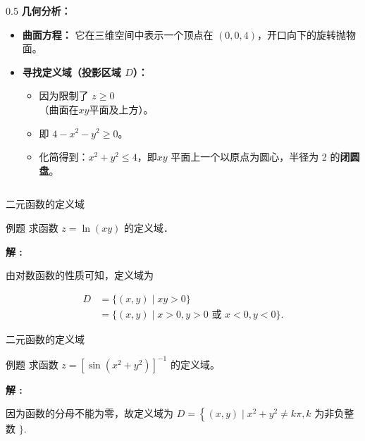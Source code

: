 \documentclass[aspectratio=169,10pt]{ctexbeamer}
\begin{document}
\begin{frame}{}
\begin{columns}[c]
\begin{column}{0.5\textwidth}
			\vspace{0.3cm}
			\textbf{几何分析：}
			\begin{itemize}
				\item \textbf{曲面方程：} 它在三维空间中表示一个顶点在 $(0,0,4)$，开口向下的旋转抛物面。
				\item \textbf{寻找定义域（投影区域 $D$）：}
				\begin{itemize}
					\item 因为限制了 $z \ge 0$\\（曲面在$xy$平面及上方）。
					\item 即 $4 - x^2 - y^2 \ge 0$。
					\item 化简得到：$x^2 + y^2 \le 4$，即$xy$ 平面上一个以原点为圆心，半径为 2 的\textbf{闭圆盘}。
				\end{itemize}
			\end{itemize}
		\end{column}
		
	\end{columns}
\end{frame}








\begin{frame}{二元函数的定义域}
	\begin{block}{例题}
		求函数 $z=\ln (x y)$ 的定义域．
	\end{block}
	
	\pause
	
	\vspace{0.5cm}
	
	\textbf{解 :}
	
	由对数函数的性质可知，定义域为
	
	$$
	\begin{aligned}
		D & =\{(x, y) \mid x y>0\} \\
		& =\{(x, y) \mid x>0, y>0 \text { 或 } x<0, y<0\} .
	\end{aligned}
	$$
	
	
	
\end{frame}


\begin{frame}{二元函数的定义域}
	\begin{block}{例题}
		求函数 $z=\left[\sin \left(x^2+y^2\right)\right]^{-1}$ 的定义域。
	\end{block}
	
	\pause
	
	\vspace{0.8cm}
	
	\textbf{解 :}
	
	因为函数的分母不能为零，故定义域为
	$D=\left\{(x, y) \mid x^2+y^2 \neq k \pi, k\right.$ 为非负整数 $\}$.
	
	
	
\end{frame}
\end{document}
